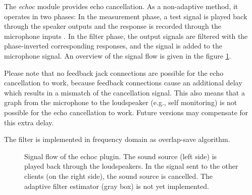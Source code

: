 The {\em echoc} module provides echo cancellation. As a non-adaptive method, it operates in two phases: In the measurement phase, a test signal is played back through the speaker outputs  and the response is recorded through the microphone inputs . In the filter phase, the output signals are filtered with the phase-inverted corresponding responses, and the signal is added to the microphone signal. An overview of the signal flow is given in the figure \ref{fig:modechoc}.

Please note that no feedback jack connections are possible for the echo cancellation to work, because feedback connections cause an additional delay which results in a mismatch of the cancellation signal. This also means that a graph from the microphone to the loudspeaker (e.g., self monitoring) is not possible for the echo cancellation to work. Future versions may compensate for this extra delay.

The filter is implemented in frequency domain as overlap-save algorithm.

\begin{figure}[htb]
    \centering
    \caption{Signal flow of the echoc plugin. The sound source (left side) is played back through the loudspeakers. In the signal sent to the other clients (on the right side), the sound source is cancelled. The adaptive filter estimator (gray box) is not yet implemented.}
    \label{fig:modechoc}
\end{figure}



